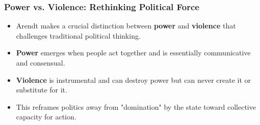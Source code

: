 \documentclass{beamer}
\begin{document}
\begin{frame}
\frametitle{Power vs. Violence: Rethinking Political Force}
\begin{itemize}
    \item Arendt makes a crucial distinction between \textbf{power} and \textbf{violence} that challenges traditional political thinking.
    \item \textbf{Power} emerges when people act together and is essentially communicative and consensual.
    \item \textbf{Violence} is instrumental and can destroy power but can never create it or substitute for it.
    \item This reframes politics away from "domination" by the state toward collective capacity for action.
\end{itemize}

\begin{center}
\end{center}
\end{frame}
\end{document}
